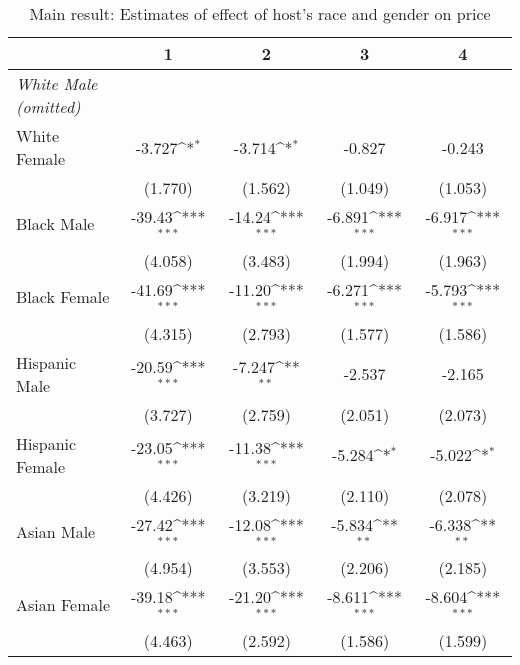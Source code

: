 {
\def\sym#1{\ifmmode^{#1}\else\(^{#1}\)\fi}
\begin{longtable}{l*{4}{c}}
\caption{Main result: Estimates of effect of host's race and gender on price}\\
\hline\hline\endfirsthead\hline\endhead\hline\endfoot\endlastfoot
                    &\multicolumn{1}{c}{1}&\multicolumn{1}{c}{2}&\multicolumn{1}{c}{3}&\multicolumn{1}{c}{4}\\
\hline
\textit{White Male (omitted)}  \\

White Female        &      -3.727\sym{*}  &      -3.714\sym{*}  &      -0.827         &      -0.243         \\
                    &     (1.770)         &     (1.562)         &     (1.049)         &     (1.053)         \\
[1em]
Black Male          &      -39.43\sym{***}&      -14.24\sym{***}&      -6.891\sym{***}&      -6.917\sym{***}\\
                    &     (4.058)         &     (3.483)         &     (1.994)         &     (1.963)         \\
[1em]
Black Female        &      -41.69\sym{***}&      -11.20\sym{***}&      -6.271\sym{***}&      -5.793\sym{***}\\
                    &     (4.315)         &     (2.793)         &     (1.577)         &     (1.586)         \\
[1em]
Hispanic Male       &      -20.59\sym{***}&      -7.247\sym{**} &      -2.537         &      -2.165         \\
                    &     (3.727)         &     (2.759)         &     (2.051)         &     (2.073)         \\
[1em]
Hispanic Female     &      -23.05\sym{***}&      -11.38\sym{***}&      -5.284\sym{*}  &      -5.022\sym{*}  \\
                    &     (4.426)         &     (3.219)         &     (2.110)         &     (2.078)         \\
[1em]
Asian Male          &      -27.42\sym{***}&      -12.08\sym{***}&      -5.834\sym{**} &      -6.338\sym{**} \\
                    &     (4.954)         &     (3.553)         &     (2.206)         &     (2.185)         \\
[1em]
Asian Female        &      -39.18\sym{***}&      -21.20\sym{***}&      -8.611\sym{***}&      -8.604\sym{***}\\
                    &     (4.463)         &     (2.592)         &     (1.586)         &     (1.599)         \\

\end{longtable}}
